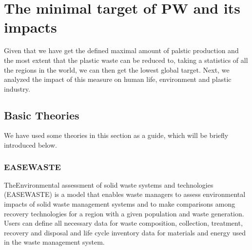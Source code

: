 \documentclass{mcmthesis}
\begin{document}


\section{The minimal target of PW and its impacts }

Given that we have get the defined maximal amount of palstic production and the most extent that the plastic waste can be reduced to, taking a statistics of all the regions in the world, we can then get the lowest global target. Next, we analyzed the impact of this measure on human life, environment and plastic industry.


\subsection{Basic Theories}

We have used some theories in this section as a guide, which will be briefly introduced below.

\subsubsection{EASEWASTE}

TheEnvironmental assessment of solid waste systems and technologies (EASEWASTE) is a model that enables waste managers to assess environmental impacts of solid waste management systems and to make comparisons among recovery technologies for a region with a given population and waste generation. Users can define all necessary data for waste composition, collection, treatment, recovery and disposal and life cycle inventory data for materials and energy used in the waste management system\cite{Kirkeby}.
\end{document}
